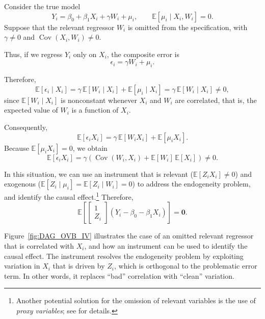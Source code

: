 Consider the true model
\[
Y_i = \beta_0 + \beta_1 X_i + \gamma W_i + \mu_i,
\qquad \mathbb{E}[\mu_i \mid X_i, W_i] = 0.
\]
Suppose that the relevant regressor $W_i$ is omitted from the specification, with $\gamma \neq 0$ and \(\operatorname{Cov}(X_i, W_i) \neq 0\).

Thus, if we regress $Y_i$ only on $X_i$, the composite error is
\[
\epsilon_i = \gamma W_i + \mu_i.
\]

Therefore,
\[
\mathbb{E}[\epsilon_i \mid X_i] 
= \gamma \, \mathbb{E}[W_i \mid X_i] + \mathbb{E}[\mu_i \mid X_i]
= \gamma \, \mathbb{E}[W_i \mid X_i] \neq 0,
\]
since $\mathbb{E}[W_i \mid X_i]$ is nonconstant whenever $X_i$ and $W_i$ are correlated, that is, the expected value of $W_i$ is a function of $X_i$.

Consequently,
\[
\mathbb{E}[\epsilon_i X_i] 
= \gamma \, \mathbb{E}[W_i X_i] + \mathbb{E}[\mu_i X_i].
\]
Because $\mathbb{E}[\mu_i X_i]=0$, we obtain
\[
\mathbb{E}[\epsilon_i X_i] = \gamma (\operatorname{Cov}(W_i,X_i) 
+ \mathbb{E}[W_i] \, \mathbb{E}[X_i])\neq 0.
\]

In this situation, we can use an instrument that is relevant ($\mathbb{E}[Z_i X_i] \neq 0$) and exogenous ($\mathbb{E}[Z_i \mid \mu_i] = \mathbb{E}[Z_i \mid W_i] = 0$) to address the endogeneity problem, and identify the causal effect.\footnote{Another potential solution for the omission of relevant variables is the use of \textit{proxy variables}; see \cite{wooldridge2010econometric} for details.} Therefore,
\[
\mathbb{E}\left[\begin{bmatrix}
	1\\
	Z_i
\end{bmatrix}(Y_i-\beta_0-\beta_1X_i)\right]=\mathbf{0}.
\] 

Figure~\ref{fig:DAG_OVB_IV} illustrates the case of an omitted relevant regressor that is correlated with $X_i$, and how an instrument can be used to identify the causal effect. The instrument resolves the endogeneity problem by exploiting variation in $X_i$ that is driven by $Z_i$, which is orthogonal to the problematic error term. In other words, it replaces ``bad'' correlation with ``clean'' variation.
 
